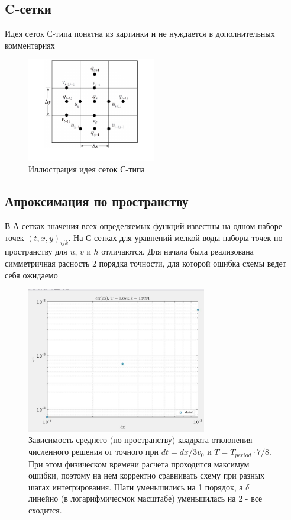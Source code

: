 \documentclass[a4paper,12pt]{article} %
\begin{document}
\subsection{C-сетки}

Идея сеток С-типа понятна из картинки и не нуждается в дополнительных комментариях

\begin{figure}[h!]
\begin{center}
\includegraphics[width=0.5\textwidth]{./pics/Ctype_idea}
\end{center}
\caption{Иллюстрация идея сеток С-типа} \label{img:Ctype_idea}
\end{figure}

\subsection{Апроксимация по пространству}

В А-сетках значения всех определяемых функций известны на одном наборе точек $(t,x,y)_{ijk}$. На С-сетках для уравнений мелкой воды наборы точек по пространству для $u$, $v$ и $h$ отличаются. Для начала была реализована симметричная расность 2 порядка точности, для которой ошибка схемы ведет себя ожидаемо

\newpage

\begin{figure}[h!]
\begin{center}
\includegraphics[width=0.7\textwidth]{./pics/Ctype_nErr}
\end{center}
\caption{Зависимость среднего (по пространству) квадрата отклонения численного решения от точного при $dt = dx/3v_0$ и $T = T_{period} \cdot 7/8$. При этом физическом времени расчета проходится максимум ошибки, поэтому на нем корректно сравнивать схему при разных шагах интегрирования. Шаги уменьшились на 1 порядок, а $\delta$ линейно (в логарифмичесмок масштабе) уменьшилась на 2 - все сходится.} \label{img:Atype_nErr}
\end{figure}
\end{document}
